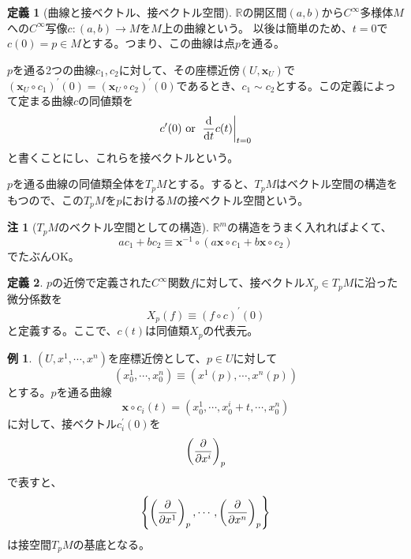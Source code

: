 \documentclass[unicode,a4paper,11pt]{ltjsarticle}
\theoremstyle{definition}
\newtheorem{dfn}{定義}[section]
\newtheorem{exm}{例}[section]
\newtheorem{rmk}{注}[section]
\begin{document}
\begin{dfn}[曲線と接ベクトル、接ベクトル空間]
  $\mathbb{R}$の開区間$(a,b)$から$C^{\infty}$多様体$M$への$C^{\infty}$写像$c:(a,b)\rightarrow M$を$M$上の曲線という。  以後は簡単のため、$t=0$で$c(0)=p\in M$とする。つまり、この曲線は点$p$を通る。

  $p$を通る2つの曲線$c_{1},c_{2}$に対して、その座標近傍$(U,\bm{x}_{U})$で$(\bm{x}_{U}\circ c_{1})^{\prime}(0)=(\bm{x}_{U}\circ c_{2})^{\prime}(0)$であるとき、$c_{1}\sim c_{2}$とする。この定義によって定まる曲線$c$の同値類を
  \begin{equation}
    c'(0)
    \mathrm{\ or\ }
    \left.\dv{}{t}c(t)\right|_{t=0}
  \end{equation}
  と書くことにし、これらを接ベクトルという。

  $p$を通る曲線の同値類全体を$T_{p}M$とする。すると、$T_{p}M$はベクトル空間の構造をもつので、この$T_{p}M$を$p$における$M$の接ベクトル空間という。
\end{dfn}

\begin{rmk}[$T_{p}M$のベクトル空間としての構造]
  $\mathbb{R}^{m}$の構造をうまく入れればよくて、
  \begin{equation}
    ac_{1}+bc_{2}
    \equiv
    \bm{x}^{-1}\circ(a\bm{x}\circ c_{1}+b\bm{x}\circ c_{2})
  \end{equation}
  でたぶんOK。
\end{rmk}

\begin{dfn}
  $p$の近傍で定義された$C^{\infty}$関数$f$に対して、接ベクトル$X_{p}\in T_{p}M$に沿った微分係数を
  \begin{equation}
    X_{p}(f)
    \equiv
    (f\circ c)^{\prime}(0)
  \end{equation}
  と定義する。ここで、$c(t)$は同値類$X_{p}$の代表元。
\end{dfn}

\begin{exm}
  $(U,x^{1},\cdots,x^{n})$を座標近傍として、$p\in U$に対して
  \begin{equation}
    (x_{0}^{1},\cdots,x_{0}^{n})
    \equiv
    (x^{1}(p),\cdots,x^{n}(p))
  \end{equation}
  とする。$p$を通る曲線
  \begin{equation}
    \bm{x}\circ c_{i}(t)=(x_{0}^{1},\cdots,x_{0}^{i}+t,\cdots,x_{0}^{n})
  \end{equation}
  に対して、接ベクトル$c_{i}^{\prime}(0)$を
  \begin{equation}
    \left( \pdv{}{x^{i}} \right)_{p}
  \end{equation}
  で表すと、
  \begin{equation}
    \left\{
    \left( \pdv{}{x^{1}} \right)_{p}
    ,\cdots,
    \left( \pdv{}{x^{n}} \right)_{p}
    \right\}
  \end{equation}
  は接空間$T_{p}M$の基底となる。
\end{exm}
\end{document}

